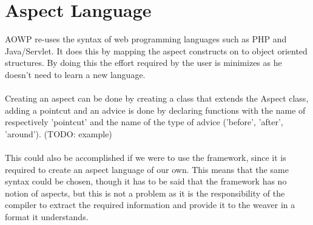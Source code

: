 \documentclass[a4paper]{report}
\begin{document}
\section{Aspect Language}
AOWP re-uses the syntax of web programming languages such as PHP and Java/Servlet. It does this by mapping the aspect constructs on to object oriented structures. By doing this the effort required by the user is minimizes as he doesn't need to learn a new language.\\
\\
Creating an aspect can be done by creating a class that extends the Aspect class, adding a pointcut and an advice is done by declaring functions with the name of respectively 'pointcut' and the name of the type of advice ('before', 'after', 'around'). (TODO: example)\\
\\
This could also be accomplished if we were to use the framework, since it is required to create an aspect language of our own. This means that the same syntax could be chosen, though it has to be said that the framework has no notion of aspects, but this is not a problem as it is the responsibility of the compiler to extract the required information and provide it to the weaver in a format it understands.
\end{document}
